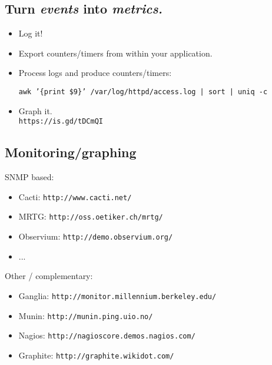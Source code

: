 \documentclass[xga]{xdvislides}
\begin{document}
\subsection{Turn {\em events} into {\em metrics.}}
\begin{itemize}
	\item Log it!
\end{itemize}

\addvspace{.5in}
\begin{itemize}
	\item Export counters/timers from within your application.
	\item Process logs and produce counters/timers:
\begin{verbatim}
awk ’{print $9}’ /var/log/httpd/access.log | sort | uniq -c
\end{verbatim}
\end{itemize}

\addvspace{.5in}
\begin{itemize}
	\item Graph it. \\
	{\tt https://is.gd/tDCmQI}
\end{itemize}

\subsection{Monitoring/graphing}
SNMP based:
\begin{itemize}
	\item Cacti: \verb+http://www.cacti.net/+
	\item MRTG: \verb+http://oss.oetiker.ch/mrtg/+
	\item Observium: \verb+http://demo.observium.org/+
	\item ...
\end{itemize}
\vspace{.2in}
Other / complementary:
\begin{itemize}
	\item Ganglia: \verb+http://monitor.millennium.berkeley.edu/+
	\item Munin: \verb+http://munin.ping.uio.no/+
	\item Nagios: \verb+http://nagioscore.demos.nagios.com/+
	\item Graphite: \verb+http://graphite.wikidot.com/+
\end{itemize}
\vspace{.5in}
\end{document}
